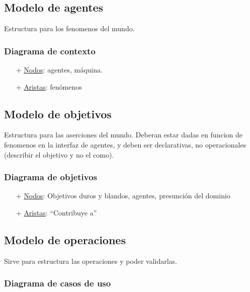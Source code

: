 \subsection{Modelo de agentes}

  Estructura para los fenomenos del mundo.

  \subsubsection{Diagrama de contexto}

  \begin{itemize}
    \item[+] \underline{Nodos}: agentes, m\'aquina. 
    \item[+] \underline{Aristas}: fen\'omenos
  \end{itemize}

  
\subsection{Modelo de objetivos}

  Estructura para las aserciones del mundo. Deberan estar dadas en funcion de fenomenos en la interfaz de agentes, y deben ser declarativas, no operacionales (describir el objetivo y no el como). 

  \subsubsection{Diagrama de objetivos}
  \begin{itemize}
    \item[+] \underline{Nodos}: Objetivos duros y blandos, agentes, presunci\'on del dominio
    \item[+] \underline{Aristas}: ``Contribuye a''
  \end{itemize}


\subsection{Modelo de operaciones}

  Sirve para estructura las operaciones y poder validarlas. 

  \subsubsection{Diagrama de casos de uso}
  
